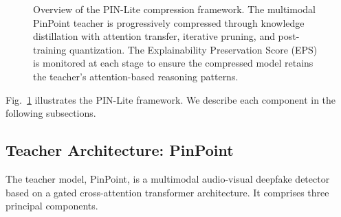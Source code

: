 \documentclass[lettersize,journal]{IEEEtran}
\begin{document}
\begin{figure}[!t]
\centering
{}
\caption{Overview of the PIN-Lite compression framework. The multimodal PinPoint teacher is progressively compressed through knowledge distillation with attention transfer, iterative pruning, and post-training quantization. The Explainability Preservation Score (EPS) is monitored at each stage to ensure the compressed model retains the teacher's attention-based reasoning patterns.}
\label{fig:framework}
\end{figure}

Fig.~\ref{fig:framework} illustrates the PIN-Lite framework. We describe each component in the following subsections.

\subsection{Teacher Architecture: PinPoint}
\label{sec:teacher}

The teacher model, PinPoint, is a multimodal audio-visual deepfake detector based on a gated cross-attention transformer architecture. It comprises three principal components.
\end{document}
